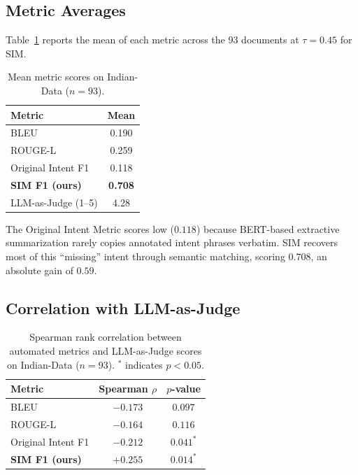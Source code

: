 \documentclass[conference,a4paper]{IEEEtran}
\begin{document}
\subsection{Metric Averages}
Table~\ref{tab:averages} reports the mean of each metric across the 93 documents at $\tau{=}0.45$ for SIM.

\begin{table}[t]
\centering
\caption{Mean metric scores on Indian-Data ($n{=}93$).}
\label{tab:averages}
\small
\begin{tabular}{lc}
\toprule
Metric & Mean \\
\midrule
BLEU                            & 0.190 \\
ROUGE-L                         & 0.259 \\
Original Intent F1 \cite{mullick2022}    & 0.118 \\
\textbf{SIM F1 (ours)}          & \textbf{0.708} \\
LLM-as-Judge (1--5)             & 4.28 \\
\bottomrule
\end{tabular}
\end{table}

The Original Intent Metric scores low ($0.118$) because BERT-based extractive summarization rarely copies annotated intent phrases verbatim. SIM recovers most of this ``missing'' intent through semantic matching, scoring $0.708$, an absolute gain of $0.59$.

\subsection{Correlation with LLM-as-Judge}

\begin{table}[t]
\centering
\caption{Spearman rank correlation between automated metrics and LLM-as-Judge scores on Indian-Data ($n{=}93$). $^{*}$ indicates $p < 0.05$.}
\label{tab:correlation}
\small
\begin{tabular}{lcc}
\toprule
Metric & Spearman $\rho$ & $p$-value \\
\midrule
BLEU                       & $-0.173$ & $0.097$ \\
ROUGE-L                    & $-0.164$ & $0.116$ \\
Original Intent F1         & $-0.212$ & $0.041^{*}$ \\
\textbf{SIM F1 (ours)}     & $\mathbf{+0.255}$ & $\mathbf{0.014^{*}}$ \\
\bottomrule
\end{tabular}
\end{table}
\end{document}
